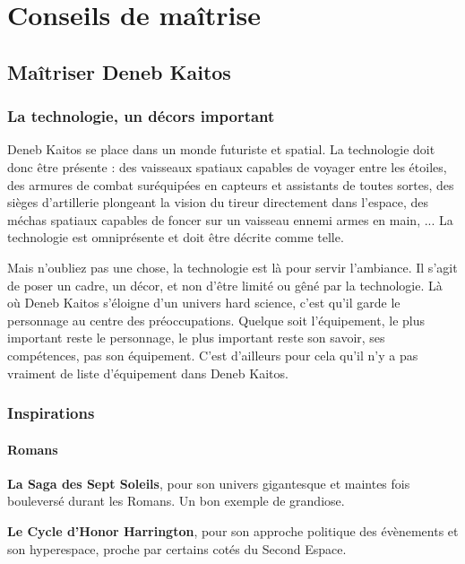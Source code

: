 \part{Conseils de maîtrise}

\chapter{Maîtriser Deneb Kaitos}

\begin{multicols}{2}

\section{La technologie, un décors important}

Deneb Kaitos se place dans un monde futuriste et spatial. La technologie doit donc être présente : des vaisseaux spatiaux capables de voyager entre les étoiles, des armures de combat suréquipées en capteurs et assistants de toutes sortes, des sièges d'artillerie plongeant la vision du tireur directement dans l'espace, des méchas spatiaux capables de foncer sur un vaisseau ennemi armes en main, ... La technologie est omniprésente et doit être décrite comme telle.

Mais n'oubliez pas une chose, la technologie est là pour servir l'ambiance. Il s'agit de poser un cadre, un décor, et non d'être limité ou gêné par la technologie. Là où Deneb Kaitos s'éloigne d'un univers hard science, c'est qu'il garde le personnage au centre des préoccupations. Quelque soit l'équipement, le plus important reste le personnage, le plus important reste son savoir, ses compétences, pas son équipement. C'est d'ailleurs pour cela qu'il n'y a pas vraiment de liste d'équipement dans Deneb Kaitos.

\section{Inspirations}

\subsection{Romans}

\textbf{La Saga des Sept Soleils}, pour son univers gigantesque et maintes fois bouleversé durant les Romans. Un bon exemple de grandiose.

\textbf{Le Cycle d'Honor Harrington}, pour son approche politique des évènements et son hyperespace, proche par certains cotés du Second Espace.


\end{multicols}
